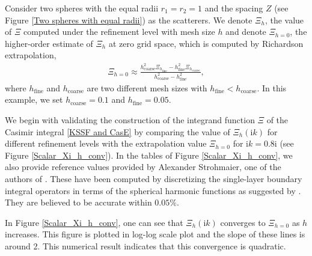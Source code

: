 Consider two spheres with the equal radii $r_1 = r_2 = 1$ and the spacing $Z$ (see Figure \ref{Two spheres with equal radii}) as the scatterers.
We denote $\Xi_{h}$, the value of $\Xi$ computed under the refinement level with mesh size $h$ and denote $\Xi_{h = 0}$, the higher-order estimate of 
$\Xi_{h}$ at zero grid space, which is computed by Richardson extrapolation,
\begin{align}\label{Extrapolation formula}
    \Xi_{h = 0} \approx \frac{h_{\text{coarse}}^{2}\Xi_{h_\text{fine}}  - h_{\text{fine}}^{2}\Xi_{h_\text{coarse}}}{h_{\text{coarse}}^{2}  - h_{\text{fine}}^{2}},
\end{align}
where $h_{\text{fine}}$ and $h_{\text{coarse}}$ are two different mesh sizes with $h_{\text{fine}} < h_{\text{coarse}}$. In this example, we set $h_{\text{coarse}} = 0.1$ and $h_{\text{fine}} = 0.05$.

We begin with validating the construction of the integrand function $\Xi$ of the Casimir integral \eqref{KSSF and CasE} by comparing the value of 
$\Xi_{h}(\mathrm{i}k)$ for different refinement levels with the extrapolation value $\Xi_{h = 0}$ for $\mathrm{i}k = 0.8\mathrm{i}$ (see Figure \ref{Scalar_Xi_h_conv}). In the tables of 
Figure \ref{Scalar_Xi_h_conv}, we also provide reference values provided by Alexander Strohmaier, one of the authors of \cite{hanisch2020relative}.
These have been computed by discretizing the single-layer boundary integral operators in terms of the spherical harmonic functions as suggested by \cite{kenneth2008casimir}.
They are believed to be accurate within $0.05\%$.


In Figure \ref{Scalar_Xi_h_conv}, one can see that $\Xi_{h}(\mathrm{i}k)$ converges to $\Xi_{h = 0}$ as $h$ increases.
This figure is plotted in log-log scale plot and the slope of these lines is around 2. This numerical result indicates that this convergence is quadratic.

